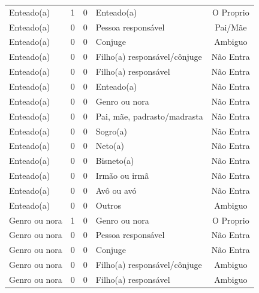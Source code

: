 \documentclass[
	12pt,				%
	openright,			%
	twoside,			%
	a4paper,			%
	english,			%
	french,				%
	spanish,			%
	brazil				%
	]{abntex2}
\begin{document}
\begin{anexosenv}
\begin{longtable}{@{}lcclc@{}}
Enteado(a)                   & 1         & 0        & Enteado(a)                   & O Proprio       \\
Enteado(a)                   & 0         & 0        & Pessoa responsável           & Pai/Mãe         \\
Enteado(a)                   & 0         & 0        & Conjuge                      & Ambiguo         \\
Enteado(a)                   & 0         & 0        & Filho(a) responsável/cônjuge & Não Entra       \\
Enteado(a)                   & 0         & 0        & Filho(a) responsável         & Não Entra       \\
Enteado(a)                   & 0         & 0        & Enteado(a)                   & Não Entra       \\
Enteado(a)                   & 0         & 0        & Genro ou nora                & Não Entra       \\
Enteado(a)                   & 0         & 0        & Pai, mãe, padrasto/madrasta  & Não Entra       \\
Enteado(a)                   & 0         & 0        & Sogro(a)                     & Não Entra       \\
Enteado(a)                   & 0         & 0        & Neto(a)                      & Não Entra       \\
Enteado(a)                   & 0         & 0        & Bisneto(a)                   & Não Entra       \\
Enteado(a)                   & 0         & 0        & Irmão ou irmã                & Não Entra       \\
Enteado(a)                   & 0         & 0        & Avô ou avó                   & Não Entra       \\
Enteado(a)                   & 0         & 0        & Outros                       & Ambiguo         \\
Genro ou nora                & 1         & 0        & Genro ou nora                & O Proprio       \\
Genro ou nora                & 0         & 0        & Pessoa responsável           & Não Entra       \\
Genro ou nora                & 0         & 0        & Conjuge                      & Não Entra       \\
Genro ou nora                & 0         & 0        & Filho(a) responsável/cônjuge & Ambiguo         \\
Genro ou nora                & 0         & 0        & Filho(a) responsável         & Ambiguo         \\

\end{longtable}
\end{anexosenv}
\end{document}
